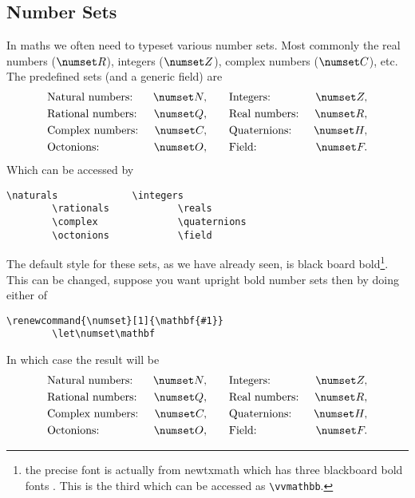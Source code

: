 \documentclass[fleqn, a4paper, openany]{memoir}
\newcommand{\package}[1]{{\textsf{\footnotesize #1}}}  %
\begin{document}
    \subsection{Number Sets}
    In maths we often need to typeset various number sets.
    Most commonly the real numbers (\(\reals\)), integers (\(\integers\)), complex numbers (\(\complex\)), etc.
    The predefined sets (and a generic field) are
    \begin{align}
        &\text{Natural numbers:}~&\naturals,\qquad &\text{Integers:}~&\integers,\\
        &\text{Rational numbers:}~&\rationals,\qquad &\text{Real numbers:}~&\reals,\\
        &\text{Complex numbers:}~&\complex,\qquad &\text{Quaternions:}~&\quaternions,\\
        &\text{Octonions:}~&\octonions,\qquad &\text{Field:}~&\field.
    \end{align}
    Which can be accessed by
    \begin{Verbatim}[gobble=2]
        \naturals             \integers
        \rationals            \reals
        \complex              \quaternions
        \octonions            \field
    \end{Verbatim}

    The default style for these sets, as we have already seen, is black board bold\footnote{the precise font is actually from \package{newtxmath} which has three blackboard bold fonts \cite{newtx}. This is the third which can be accessed as \texttt{\textbackslash{}vvmathbb}.}.
    This can be changed, suppose you want upright bold number sets then by doing either of
    \begin{Verbatim}[gobble=2]
        \renewcommand{\numset}[1]{\mathbf{#1}}
        \let\numset\mathbf
    \end{Verbatim}
    In which case the result will be
    \let\oldnumset\numset
    \let\numset\mathbf
    \begin{align}
        &\text{Natural numbers:}~&\naturals,\qquad &\text{Integers:}~&\integers,\\
        &\text{Rational numbers:}~&\rationals,\qquad &\text{Real numbers:}~&\reals,\\
        &\text{Complex numbers:}~&\complex,\qquad &\text{Quaternions:}~&\quaternions,\\
        &\text{Octonions:}~&\octonions,\qquad &\text{Field:}~&\field.
    \end{align}
    \let\numset\oldnumset
    
\end{document}

